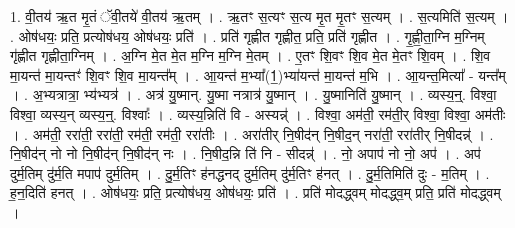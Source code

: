 \documentclass[17pt]{extarticle}
\begin{document}
1. वी॒तय॑ ऋ॒त मृ॒तं ॅवी॒तये॑ वी॒तय॑ ऋ॒तम् । . ऋ॒तꣳ स॒त्यꣳ स॒त्य मृ॒त मृ॒तꣳ स॒त्यम् । . स॒त्यमिति॑ स॒त्यम् । . ओष॑धयः॒ प्रति॒ प्रत्योष॑धय॒ ओष॑धयः॒ प्रति॑ । . प्रति॑ गृह्णीत गृह्णीत॒ प्रति॒ प्रति॑ गृह्णीत । . गृ॒ह्णी॒ता॒ग्नि म॒ग्निम् गृ॑ह्णीत गृह्णीता॒ग्निम् । . अ॒ग्नि मे॒त मे॒त म॒ग्नि म॒ग्नि मे॒तम् । . ए॒तꣳ शि॒वꣳ शि॒व मे॒त मे॒तꣳ शि॒वम् । . शि॒व मा॒यन्त॑ मा॒यन्तꣳ॑ शि॒वꣳ शि॒व मा॒यन्त᳚म् । . आ॒यन्त॑ म॒भ्या᳚(1॒)भ्या॑यन्त॑ मा॒यन्त॑ म॒भि । . आ॒यन्त॒मित्या᳚ - यन्त᳚म् । . अ॒भ्यत्रात्रा॒ भ्य॑भ्यत्र॑ । . अत्र॑ यु॒ष्मान्. यु॒ष्मा नत्रात्र॑ यु॒ष्मान् । . यु॒ष्मानिति॑ यु॒ष्मान् । . व्यस्य॒न्॒. विश्वा॒ विश्वा॒ व्यस्य॒न् व्यस्य॒न्॒. विश्वाः᳚ । . व्यस्य॒न्निति॑ वि - अस्यन्न्॑ । . विश्वा॒ अम॑ती॒ रम॑ती॒र् विश्वा॒ विश्वा॒ अम॑तीः । . अम॑ती॒ ररा॑ती॒ ररा॑ती॒ रम॑ती॒ रम॑ती॒ ररा॑तीः । . अरा॑तीर् नि॒षीद॑न् नि॒षीद॒न् नरा॑ती॒ ररा॑तीर् नि॒षीदन्न्॑ । . नि॒षीद॑न् नो नो नि॒षीद॑न् नि॒षीद॑न् नः । . नि॒षीद॒न्नि ति॑ नि - सीदन्न्॑ । . नो॒ अपाप॑ नो नो॒ अप॑ । . अप॑ दुर्म॒तिम् दु॑र्म॒ति मपाप॑ दुर्म॒तिम् । . दु॒र्म॒तिꣳ ह॑नद्धनद् दुर्म॒तिम् दु॑र्म॒तिꣳ ह॑नत् । . दु॒र्म॒तिमिति॑ दुः - म॒तिम् । . ह॒न॒दिति॑ हनत् । . ओष॑धयः॒ प्रति॒ प्रत्योष॑धय॒ ओष॑धयः॒ प्रति॑ । . प्रति॑ मोदद्ध्वम् मोदद्ध्व॒म् प्रति॒ प्रति॑ मोदद्ध्वम् । \newline
\end{document}
